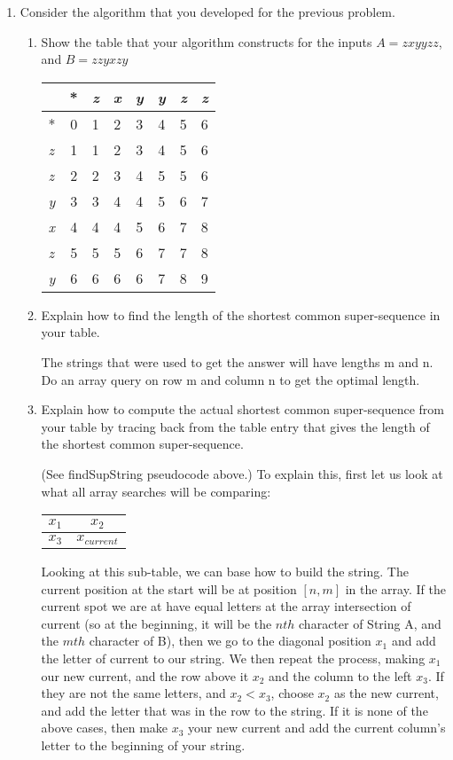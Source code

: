 \documentclass{article}
\begin{document}
\begin{enumerate}
\item Consider the algorithm that you developed for the previous problem.
\newline
\begin{enumerate}
\item Show the table that your algorithm constructs for the inputs $A = zxyyzz$, and $B = zzyxzy$

\begin{tabular}{| l | c | c | c | c | c | c | r | }
\hline
   	& * & \textit{z} & \textit{x} & \textit{y} & \textit{y} & \textit{z} & \textit{z} \\ \hline
  * 	   & 0 & 1 & 2 & 3 & 4 & 5 & 6 \\ \hline
\textit{z} & 1 & 1 & 2 & 3 & 4 & 5 & 6 \\ \hline
\textit{z} & 2 & 2 & 3 & 4 & 5 & 5 & 6 \\ \hline
\textit{y} & 3 & 3 & 4 & 4 & 5 & 6 & 7 \\ \hline
\textit{x} & 4 & 4 & 4 & 5 & 6 & 7 & 8 \\ \hline
\textit{z} & 5 & 5 & 5 & 6 & 7 & 7 & 8 \\ \hline
\textit{y} & 6 & 6 & 6 & 6 & 7 & 8 & 9 \\ \hline
\end{tabular}


\item Explain how to find the length of the shortest common super-sequence in your table.

The strings that were used to get the answer will have lengths m and n. Do an array query on row m and column n to get the optimal length.
\newline

\item Explain how to compute the actual shortest common super-sequence from your table by tracing back from the table entry that gives the length of the shortest common super-sequence. 
\newline

(See findSupString pseudocode above.) To explain this, first let us look at what all array searches will be comparing:

\begin{tabular}{ l | c}
$x_{1}$ & $x_{2}$ \\ \hline
$x_{3}$ & $x_{current}$
\end{tabular}
Looking at this sub-table, we can base how to build the string. The current position at the start will be at position $[n,m]$ in the array. If the current spot we are at have equal letters at the array intersection of current (so at the beginning, it will be the $nth$ character of String A, and the $mth$ character of B), then we go to the diagonal position $x_{1}$ and add the letter of current to our string. We then repeat the process, making $x_{1}$ our new current, and the row above it $x_{2}$ and the column to the left $x_{3}$. If they are not the same letters, and $x_{2} < x_{3}$, choose $x_{2}$ as the new current, and add the letter that was in the row to the string. If it is none of the above cases, then make $x_{3}$ your new current and add the current column's letter to the beginning of your string.


\end{enumerate}
\end{enumerate}
\end{document}
